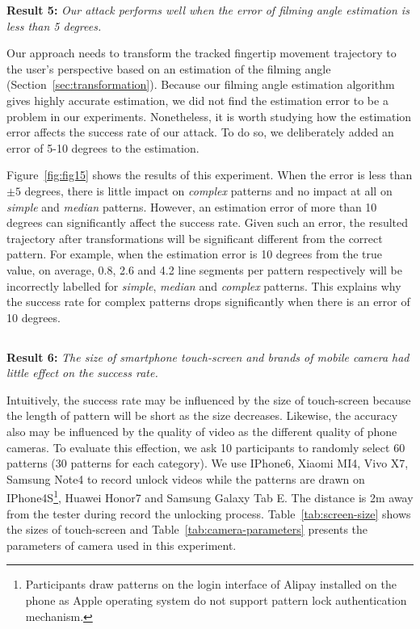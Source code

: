    \noindent \textbf{Result 5:} \emph{Our attack performs well when the error of filming angle estimation is less than 5 degrees.}

   Our approach needs to transform the tracked fingertip movement trajectory to the
   user's perspective based on an estimation of the filming angle
   (Section~\ref{sec:transformation}).
   Because our filming angle estimation
    algorithm gives highly accurate estimation, we did not find the estimation error to be a problem in our experiments.
   Nonetheless, it is worth studying how the estimation error affects the success rate of our attack. To do so, we deliberately added an error of 5-10 degrees to the estimation.

    Figure~\ref{fig:fig15} shows the results of this experiment. When the error is less than $\pm 5$ degrees, there is little impact
    on \emph{complex} patterns and no impact at all on \emph{simple} and
    \emph{median} patterns. However, an estimation error of more than 10 degrees can significantly affect the success rate.
    Given such an error, the resulted trajectory after transformations will
    be significant different from the correct pattern.
    For example, when the estimation error is 10 degrees from the
    true value,  on average, 0.8, 2.6 and 4.2 line segments per pattern respectively will
    be incorrectly labelled for \emph{simple}, \emph{median} and
    \emph{complex} patterns. This explains why the success rate for complex patterns drops significantly when there is
    an error of 10 degrees.

    \subsection{}
    \noindent \textbf{Result 6:} \emph{The size of smartphone touch-screen and brands of mobile camera had little effect on the success rate.}

    Intuitively, the success rate may be influenced by the size of touch-screen because the length of pattern will be short as the size decreases. Likewise, the accuracy also may be influenced by the quality of video as the different quality of phone cameras. To evaluate this effection, we ask 10 participants to randomly select 60 patterns (30 patterns for each category). We use IPhone6, Xiaomi MI4, Vivo X7, Samsung Note4 to record unlock videos while the patterns are drawn on IPhone4S\footnote{Participants draw patterns on the login interface of Alipay installed on the phone as Apple operating system do not support pattern lock authentication mechanism.}, Huawei Honor7 and Samsung Galaxy Tab E. The distance is 2m away from the tester during record the unlocking process. Table~\ref{tab:screen-size} shows the sizes of touch-screen and Table~\ref{tab:camera-parameters} presents the parameters of camera used in this experiment.
    
